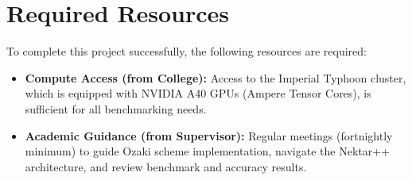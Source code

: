 \documentclass[10pt, a4paper]{article}
\begin{document}
\section*{Required Resources}

To complete this project successfully, the following resources are required:
\begin{itemize}[leftmargin=*, label={\color{ImperialBlue}\textbullet}, nosep, topsep=0pt]
    \item \textbf{Compute Access (from College):} Access to the Imperial Typhoon cluster, which is equipped with NVIDIA A40 GPUs (Ampere Tensor Cores), is sufficient for all benchmarking needs.
    \item \textbf{Academic Guidance (from Supervisor):} Regular meetings (fortnightly minimum) to guide Ozaki scheme implementation, navigate the Nektar++ architecture, and review benchmark and accuracy results.
\end{itemize}
\end{document}

